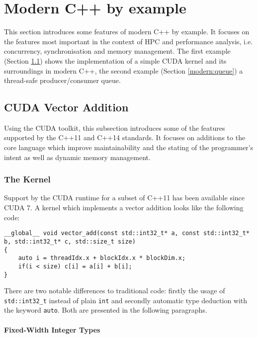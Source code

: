 \section{Modern C++ by example}\label{modern}

This section introduces some features of modern C++ by example. It focuses on the features most important in the context of HPC and performance analysis, i.e. concurrency, synchronisation and memory management. The first example (Section \ref{modern:vec_add}) shows the implementation of a simple CUDA kernel and its surroundings in modern C++, the second example (Section \ref{modern:queue}) a thread-safe producer/consumer queue.

\subsection{CUDA Vector Addition}\label{modern:vec_add}

Using the CUDA toolkit, this subsection introduces some of the features supported by the C++11 and C++14 standards. It focuses on additions to the core language which improve maintainability and the stating of the programmer's intent as well as dynamic memory management.

\subsubsection{The Kernel}\label{modern:vec_add:kernel}

Support by the CUDA runtime for a subset of C++11 has been available since CUDA 7. A kernel which implements a vector addition looks like the following code:

\begin{verbatim}
__global__ void vector_add(const std::int32_t* a, const std::int32_t* b, std::int32_t* c, std::size_t size)
{
    auto i = threadIdx.x + blockIdx.x * blockDim.x;
    if(i < size) c[i] = a[i] + b[i];
}
\end{verbatim}

\noindent There are two notable differences to traditional code: firstly the usage of \texttt{std::int32\_t} instead of plain \texttt{int} and secondly automatic type deduction with the keyword \texttt{auto}. Both are presented in the following paragraphs.

\paragraph{Fixed-Width Integer Types}

